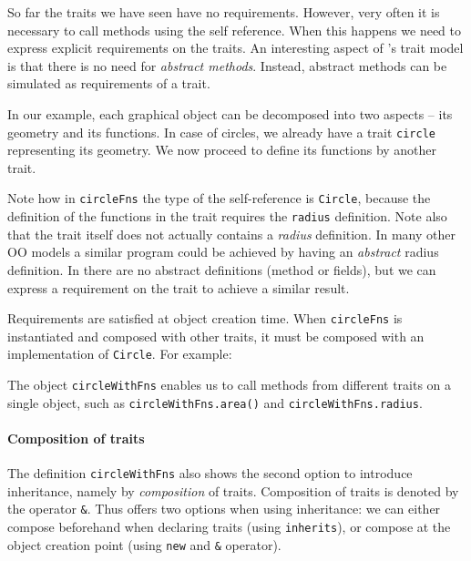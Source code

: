So far the traits we have seen have no requirements. However, very often it is
necessary to call methods using the self reference. When this happens
we need to express explicit requirements on the traits. An interesting aspect
of \name's trait model is that there is no need for \emph{abstract
  methods}. Instead, abstract methods can be simulated as requirements 
of a trait. 

In our example, each graphical object can be decomposed into two aspects -- its
geometry and its functions. In case of circles, we already have a trait
\lstinline{circle} representing its geometry. We now proceed to define its
functions by another trait.

\noindent Note how in \lstinline$circleFns$ the type of the self-reference is
\lstinline$Circle$, because the definition of the functions in the
trait requires the \lstinline{radius} definition. Note also that
the trait itself does not actually contains a \emph{radius}
definition. In many other OO models a similar program could be achieved
by having an \emph{abstract} radius definition. In \name there are no
abstract definitions (method or fields), but we can express a
requirement on the trait to achieve a similar result. 

Requirements 
are satisfied at object creation time.
When \lstinline$circleFns$ is instantiated and
composed with other traits, it must be composed with an implementation of
\lstinline$Circle$. For example:

The object \lstinline{circleWithFns} enables us to call
methods from different traits on a single object, such as
\lstinline{circleWithFns.area()} and \lstinline{circleWithFns.radius}.

\paragraph{Composition of traits}
The definition \lstinline{circleWithFns} also shows the second option to introduce inheritance, namely by
\textit{composition} of traits. Composition of traits is denoted by
the operator \lstinline{&}.  
Thus \name offers two options when using inheritance: we can either compose beforehand
when declaring traits (using \lstinline{inherits}), or compose at the object
creation point (using \lstinline{new} and \lstinline{&} operator).


